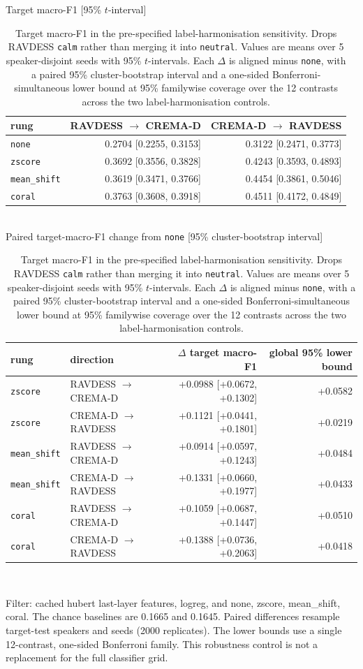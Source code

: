 \begin{table}[!t]
  \centering
  \caption{Target macro-F1 in the pre-specified label-harmonisation sensitivity. Drops RAVDESS \texttt{calm} rather than merging it into \texttt{neutral}. Values are means over 5 speaker-disjoint seeds with 95\% $t$-intervals. Each $\Delta$ is aligned minus \texttt{none}, with a paired 95\% cluster-bootstrap interval and a one-sided Bonferroni-simultaneous lower bound at 95\% familywise coverage over the 12 contrasts across the two label-harmonisation controls.}
  \label{tab:calm-sensitivity}
  \small
  Target macro-F1 [95\% $t$-interval]\\[2pt]
  \begin{tabular}{lrr}
    \toprule
    rung & RAVDESS $\rightarrow$ CREMA-D & CREMA-D $\rightarrow$ RAVDESS \\
    \midrule
    \texttt{none} & 0.2704 [0.2255, 0.3153] & 0.3122 [0.2471, 0.3773] \\
    \texttt{zscore} & 0.3692 [0.3556, 0.3828] & 0.4243 [0.3593, 0.4893] \\
    \texttt{mean\_shift} & 0.3619 [0.3471, 0.3766] & 0.4454 [0.3861, 0.5046] \\
    \texttt{coral} & 0.3763 [0.3608, 0.3918] & 0.4511 [0.4172, 0.4849] \\
    \bottomrule
  \end{tabular}
  \\[5pt]
  Paired target-macro-F1 change from \texttt{none} [95\% cluster-bootstrap interval]\\[2pt]
  \begin{tabular}{llrr}
    \toprule
    rung & direction & $\Delta$ target macro-F1 & global 95\% lower bound \\
    \midrule
    \texttt{zscore} & RAVDESS $\rightarrow$ CREMA-D & +0.0988 [+0.0672, +0.1302] & +0.0582 \\
    \texttt{zscore} & CREMA-D $\rightarrow$ RAVDESS & +0.1121 [+0.0441, +0.1801] & +0.0219 \\
    \texttt{mean\_shift} & RAVDESS $\rightarrow$ CREMA-D & +0.0914 [+0.0597, +0.1243] & +0.0484 \\
    \texttt{mean\_shift} & CREMA-D $\rightarrow$ RAVDESS & +0.1331 [+0.0660, +0.1977] & +0.0433 \\
    \texttt{coral} & RAVDESS $\rightarrow$ CREMA-D & +0.1059 [+0.0687, +0.1447] & +0.0510 \\
    \texttt{coral} & CREMA-D $\rightarrow$ RAVDESS & +0.1388 [+0.0736, +0.2063] & +0.0418 \\
    \bottomrule
  \end{tabular}
  \\[2pt]
  \begin{minipage}{\linewidth}\footnotesize Filter: cached hubert last-layer features, logreg, and none, zscore, mean\_shift, coral. The chance baselines are 0.1665 and 0.1645. Paired differences resample target-test speakers and seeds (2000 replicates). The lower bounds use a single 12-contrast, one-sided Bonferroni family. This robustness control is not a replacement for the full classifier grid.\end{minipage}
\end{table}
